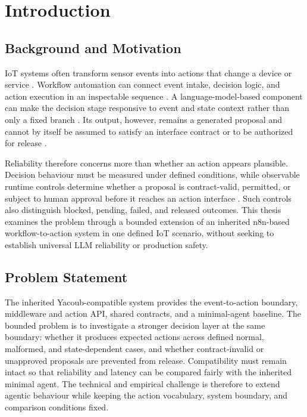 \section{Introduction}\label{sec:intro}

\setlength{\emergencystretch}{2em}

\subsection{Background and Motivation}\label{subsec:intro-background}

IoT systems often transform sensor events into actions that change a device or
service \cite{perera2014context,ur2016triggeraction}. Workflow automation can
connect event intake, decision logic, and action execution in an inspectable
sequence \cite{vanderaalst2003workflowpatterns,bock2021lowcode}. A
language-model-based component
can make the decision stage responsive to event and state context rather than
only a fixed branch \cite{wang2024surveyagents}. Its output, however, remains a generated proposal and
cannot by itself be assumed to satisfy an interface contract or to be
authorized for release \cite{wright2022jsonschemavalidation,schneider2000enforceable}.

Reliability therefore concerns more than whether an action appears plausible.
Decision behaviour must be measured under defined conditions, while observable
runtime controls determine whether a proposal is contract-valid, permitted, or
subject to human approval before it reaches an action interface
\cite{amershi2019guidelines,dzindolet2003trust}. Such controls
also distinguish blocked, pending, failed, and released outcomes. This thesis
examines the problem through a bounded extension of an inherited n8n-based
workflow-to-action system in one defined IoT scenario, without seeking to
establish universal LLM reliability or production safety.

\subsection{Problem Statement}\label{subsec:intro-problem}

The inherited Yacoub-compatible system provides the event-to-action boundary,
middleware and action API, shared contracts, and a minimal-agent baseline. The
bounded problem is to investigate a stronger decision layer at the same
boundary: whether it produces expected actions across defined normal,
malformed, and state-dependent cases, and whether contract-invalid or
unapproved proposals are prevented from release. Compatibility must remain
intact so that reliability and latency can be compared fairly with the
inherited minimal agent. The technical and empirical challenge is therefore to
extend agentic behaviour while keeping the action vocabulary, system boundary,
and comparison conditions fixed.

